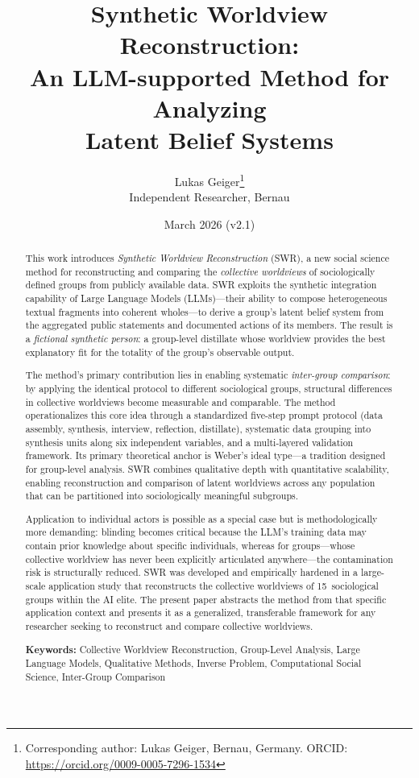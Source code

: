 \documentclass[11pt,a4paper]{article}
\title{%
  \sffamily\bfseries
  Synthetic Worldview Reconstruction:\\[0.3em]
  \large An LLM-supported Method for Analyzing\\
  Latent Belief Systems%
}
\author{%
  Lukas Geiger\thanks{Corresponding author: Lukas Geiger, Bernau, Germany. ORCID: \url{https://orcid.org/0009-0005-7296-1534}}\\[0.3em]
  \small Independent Researcher, Bernau
}
\date{March 2026 (v2.1)}
\theoremstyle{definition}
\theoremstyle{plain}
\theoremstyle{remark}
\begin{document}

\maketitle
\thispagestyle{empty}

\begin{abstract}
\noindent
This work introduces \emph{Synthetic Worldview Reconstruction} (SWR), a new social science method for reconstructing and comparing the \emph{collective worldviews} of sociologically defined groups from publicly available data. SWR exploits the synthetic integration capability of Large Language Models (LLMs)---their ability to compose heterogeneous textual fragments into coherent wholes---to derive a group's latent belief system from the aggregated public statements and documented actions of its members. The result is a \emph{fictional synthetic person}: a group-level distillate whose worldview provides the best explanatory fit for the totality of the group's observable output.

The method's primary contribution lies in enabling systematic \emph{inter-group comparison}: by applying the identical protocol to different sociological groups, structural differences in collective worldviews become measurable and comparable. The method operationalizes this core idea through a standardized five-step prompt protocol (data assembly, synthesis, interview, reflection, distillate), systematic data grouping into synthesis units along six independent variables, and a multi-layered validation framework. Its primary theoretical anchor is Weber's ideal type---a tradition designed for group-level analysis. SWR combines qualitative depth with quantitative scalability, enabling reconstruction and comparison of latent worldviews across any population that can be partitioned into sociologically meaningful subgroups.

Application to individual actors is possible as a special case but is methodologically more demanding: blinding becomes critical because the LLM's training data may contain prior knowledge about specific individuals, whereas for groups---whose collective worldview has never been explicitly articulated anywhere---the contamination risk is structurally reduced. SWR was developed and empirically hardened in a large-scale application study \citep{Geiger2026b} that reconstructs the collective worldviews of 15~sociological groups within the AI elite. The present paper abstracts the method from that specific application context and presents it as a generalized, transferable framework for any researcher seeking to reconstruct and compare collective worldviews.

\medskip
\noindent\textbf{Keywords:} Collective Worldview Reconstruction, Group-Level Analysis, Large Language Models, Qualitative Methods, Inverse Problem, Computational Social Science, Inter-Group Comparison
\end{abstract}
\end{document}
